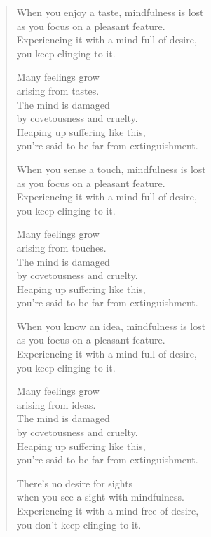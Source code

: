 \documentclass[12pt,openany]{book}%
\begin{document}
\begin{verse}
When you enjoy a taste, mindfulness is lost \\
as you focus on a pleasant feature. \\
Experiencing it with a mind full of desire, \\
you keep clinging to it. 

Many feelings grow \\
arising from tastes. \\
The mind is damaged \\
by covetousness and cruelty. \\
Heaping up suffering like this, \\
you’re said to be far from extinguishment. 

When you sense a touch, mindfulness is lost \\
as you focus on a pleasant feature. \\
Experiencing it with a mind full of desire, \\
you keep clinging to it. 

Many feelings grow \\
arising from touches. \\
The mind is damaged \\
by covetousness and cruelty. \\
Heaping up suffering like this, \\
you’re said to be far from extinguishment. 

When you know an idea, mindfulness is lost \\
as you focus on a pleasant feature. \\
Experiencing it with a mind full of desire, \\
you keep clinging to it. 

Many feelings grow \\
arising from ideas. \\
The mind is damaged \\
by covetousness and cruelty. \\
Heaping up suffering like this, \\
you’re said to be far from extinguishment. 

There’s no desire for sights \\
when you see a sight with mindfulness. \\
Experiencing it with a mind free of desire, \\
you don’t keep clinging to it. 


\end{verse}
\end{document}
